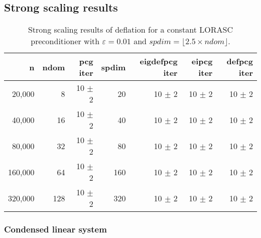 \documentclass{article}
\begin{document}
\subsection{Strong scaling results}


\begin{table}[ht]
	\caption{Strong scaling results of deflation for a constant LORASC preconditioner with $\varepsilon=0.01$ and $spdim=\lfloor 2.5 \times ndom\rfloor$.}
	\centering
	\begin{tabular}{|r|r|r|r|r|r|r|}
		\hline
		n & ndom & pcg iter & spdim & eigdefpcg iter & eipcg iter & defpcg iter\\
		\hline
		20,000  &   8 & 10 $\pm$ 2 & 20 & 10 $\pm$ 2 & 10 $\pm$ 2 & 10 $\pm$ 2 \\
		40,000  &  16 & 10 $\pm$ 2 & 40 & 10 $\pm$ 2 & 10 $\pm$ 2 & 10 $\pm$ 2 \\
		80,000  &  32 & 10 $\pm$ 2 & 80 & 10 $\pm$ 2 & 10 $\pm$ 2 & 10 $\pm$ 2 \\
		160,000 &  64 & 10 $\pm$ 2 & 160 & 10 $\pm$ 2 & 10 $\pm$ 2 & 10 $\pm$ 2 \\
		320,000 & 128 & 10 $\pm$ 2 & 320 & 10 $\pm$ 2 & 10 $\pm$ 2 & 10 $\pm$ 2 \\
		\hline
	\end{tabular}
	\label{Tab:015}
\end{table}




\subsubsection{Condensed linear system}
\end{document}
